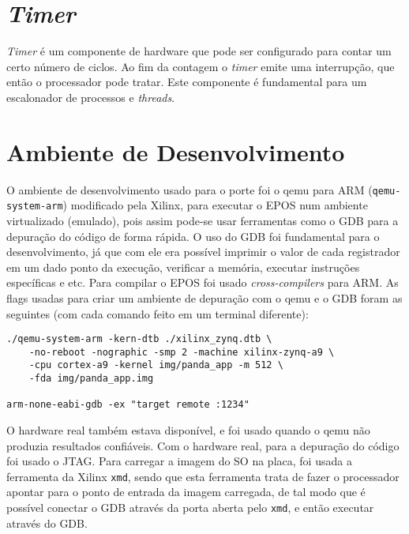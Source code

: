 \section{\emph{Timer}}

\emph{Timer} é um componente de hardware que pode ser configurado para contar um certo número de ciclos. Ao fim da contagem o \emph{timer} emite uma interrupção, que então o processador pode tratar. Este componente é fundamental para um escalonador de processos e \emph{threads}.


\section{Ambiente de Desenvolvimento}

O ambiente de desenvolvimento usado para o porte foi o qemu para ARM (\verb+qemu-system-arm+) modificado pela Xilinx, para executar o EPOS num ambiente virtualizado (emulado), pois assim pode-se usar ferramentas como o GDB para a depuração do código de forma rápida. O uso do GDB foi fundamental para o desenvolvimento, já que com ele era possível imprimir o valor de cada registrador em um dado ponto da execução, verificar a memória, executar instruções específicas e etc. Para compilar o EPOS foi usado \emph{cross-compilers} para ARM. As flags usadas para criar um ambiente de depuração com o qemu e o GDB foram as seguintes (com cada comando feito em um terminal diferente):
\begin{verbatim}
./qemu-system-arm -kern-dtb ./xilinx_zynq.dtb \
    -no-reboot -nographic -smp 2 -machine xilinx-zynq-a9 \
    -cpu cortex-a9 -kernel img/panda_app -m 512 \
    -fda img/panda_app.img

arm-none-eabi-gdb -ex "target remote :1234"
\end{verbatim}

O hardware real também estava disponível, e foi usado quando o qemu não produzia resultados confiáveis. Com o hardware real, para a depuração do código foi usado o JTAG.
Para carregar a imagem do SO na placa, foi usada a ferramenta da Xilinx \verb-xmd-, sendo que esta ferramenta trata de fazer o processador apontar para o ponto de entrada da imagem carregada, de tal modo que é possível conectar o GDB através da porta aberta pelo \verb+xmd+, e então executar através do GDB.
